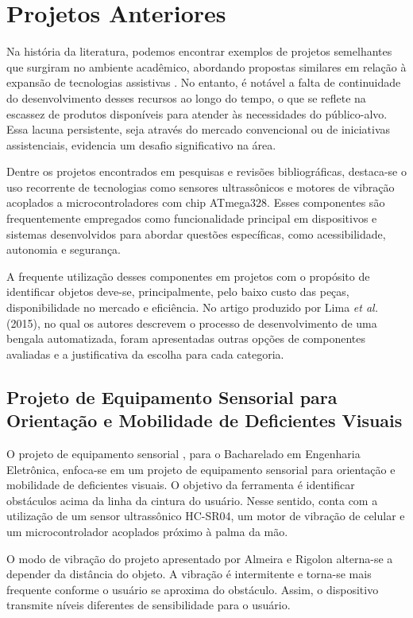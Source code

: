 \section{Projetos Anteriores}
Na história da literatura, podemos encontrar exemplos de projetos semelhantes que surgiram no ambiente acadêmico, abordando propostas similares em relação à expansão de tecnologias assistivas \cite{Rigolon} \cite{BengalaAutomatizadaArduino}. No entanto, é notável a falta de continuidade do desenvolvimento desses recursos ao longo do tempo, o que se reflete na escassez de produtos disponíveis para atender às necessidades do público-alvo. Essa lacuna persistente, seja através do mercado convencional ou de iniciativas assistenciais, evidencia um desafio significativo na área.

Dentre os projetos encontrados em pesquisas e revisões bibliográficas, destaca-se o uso recorrente de tecnologias como sensores ultrassônicos e motores de vibração acoplados a microcontroladores com chip ATmega328. Esses componentes são frequentemente empregados como funcionalidade principal em dispositivos e sistemas desenvolvidos para abordar questões específicas, como acessibilidade, autonomia e segurança.

A frequente utilização desses componentes em projetos com o propósito de identificar objetos deve-se, principalmente, pelo baixo custo das peças, disponibilidade no mercado e eficiência. No artigo produzido por Lima \textit{et al.} (2015), no qual os autores descrevem o processo de desenvolvimento de uma bengala automatizada, foram apresentadas outras opções de componentes avaliadas e a justificativa da escolha para cada categoria. 

    \subsection{Projeto de Equipamento Sensorial para Orientação e Mobilidade de Deficientes Visuais}\label{sec:citacoes}
    
        O projeto de equipamento sensorial \cite{Rigolon}, para o Bacharelado em Engenharia Eletrônica, enfoca-se em um projeto de equipamento sensorial para orientação e mobilidade de deficientes visuais. O objetivo da ferramenta é identificar obstáculos acima da linha da cintura do usuário. Nesse sentido, conta com a utilização de um sensor ultrassônico HC-SR04, um motor de vibração de celular e um microcontrolador acoplados próximo à palma da mão.
    
        O modo de vibração do projeto apresentado por Almeira e Rigolon alterna-se a depender da distância do objeto. A vibração é intermitente e torna-se mais frequente conforme o usuário se aproxima do obstáculo. Assim, o dispositivo transmite níveis diferentes de sensibilidade para o usuário.
    
